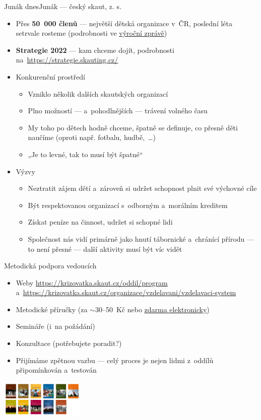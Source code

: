 \documentclass[compress, ucs, xelatex, xcolor=dvipsnames, print,
  hyperref={
    bookmarks=true,
    unicode=true,
    colorlinks=true,
    plainpages=false,
    pdfkeywords={Skaut, Junak, Skauting, Vychovna metoda},
    linkcolor=Black,
    anchorcolor=Black,
    citecolor=OliveGreen,
    filecolor=OliveGreen,
    menucolor=Black,
    urlcolor=OliveGreen,
    pdftex}
  ]{beamer}
\begin{document}
\begin{frame}{Junák dnes}{Junák --- český skaut, z. s.}
  \begin{itemize}
    \item Přes \textbf{50~000 členů} --- největší dětská organizace v~ČR, poslední léta setrvale rosteme (podrobnosti ve \href{http://www.skaut.cz/skauting/o-skautingu}{výroční zprávě})
    \item \textbf{Strategie 2022} --- kam chceme dojít, podrobnosti na~\url{https://strategie.skauting.cz/}
    \item Konkurenční prostředí
    \begin{itemize}
      \item Vzniklo několik dalších skautských organizací
      \item Plno možností --- a~pohodlnějších --- trávení volného času
      \item My toho po dětech hodně chceme, špatně se definuje, co přesně děti naučíme (oproti např. fotbalu, hudbě,~\ldots)
      \item „Je to levné, tak to musí být špatné“
    \end{itemize}
    \item Výzvy
    \begin{itemize}
      \item Neztratit zájem dětí a~zároveň si udržet schopnost plnit své výchovné cíle
      \item Být respektovanou organizací s~odborným a~morálním kreditem
      \item Získat peníze na činnost, udržet si schopné lidi
      \item Společnost nás vidí primárně jako hnutí tábornické a~chránící přírodu --- to není přesné --- další aktivity musí být víc vidět
    \end{itemize}
  \end{itemize}
\end{frame}

\begin{frame}{Metodická podpora vedoucích}
  \begin{itemize}
    \item Weby \url{https://krizovatka.skaut.cz/oddil/program} a~\url{https://krizovatka.skaut.cz/organizace/vzdelavani/vzdelavaci-system}
    \item Metodické příručky (za $\sim$30--50~Kč nebo \href{https://www.obchod.skaut.cz/index.php?tpl=&_artperpage=99&cl=alist&searchparam=&cnid=701}{zdarma elektronicky})
    \item Semináře (i~na  požádání)
    \item Konzultace (potřebujete poradit?)
    \item Přijímáme zpětnou vazbu --- celý proces je nejen lidmi z~oddílů připomínkován a~testován
  \end{itemize}
  \begin{center}
    \includegraphics[width=4cm]{prirucky.png}
  \end{center}
\end{frame}
\end{document}
